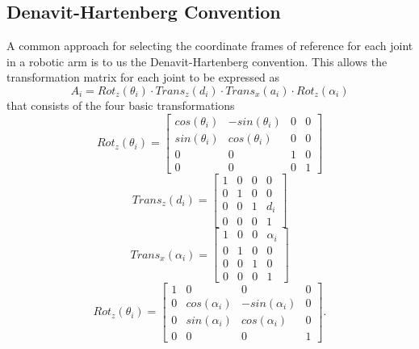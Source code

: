 \subsection*{Denavit-Hartenberg Convention}
A common approach for selecting the coordinate frames of reference for each joint in a robotic arm is to us the Denavit-Hartenberg convention. This allows the transformation matrix for each joint to be expressed as
\begin{equation}
    A_i = Rot_{z}(\theta_i) \cdot Trans_{z}(d_i) \cdot Trans_{x}(a_i) \cdot Rot_{z}(\alpha_i)
    \label{eqn:DH-transformation}
\end{equation}
that consists of the four basic transformations
\begin{equation}
    Rot_z(\theta_i) = 
    \begin{bmatrix}
        cos(\theta_i) & -sin(\theta_i) & 0 & 0 \\
        sin(\theta_i) & cos(\theta_i) & 0 & 0 \\
        0 & 0 & 1 & 0 \\
        0 & 0 & 0 & 1
    \end{bmatrix}
\end{equation}
\begin{equation}
    Trans_z(d_i) = 
    \begin{bmatrix}
        1 & 0 & 0 & 0 \\
        0 & 1 & 0 & 0 \\
        0 & 0 & 1 & d_i \\
        0 & 0 & 0 & 1
    \end{bmatrix}
\end{equation}
\begin{equation}
    Trans_x(\alpha_i) = 
    \begin{bmatrix}
        1 & 0 & 0 & \alpha_i \\
        0 & 1 & 0 & 0 \\
        0 & 0 & 1 & 0 \\
        0 & 0 & 0 & 1
    \end{bmatrix}
\end{equation}
\begin{equation}
    Rot_z(\theta_i) = 
    \begin{bmatrix}
        1 & 0 & 0 & 0 \\
        0 & cos(\alpha_i) & -sin(\alpha_i) & 0 \\
        0 & sin(\alpha_i) & cos(\alpha_i) & 0 \\
        0 & 0 & 0 & 1
    \end{bmatrix}.
\end{equation}


